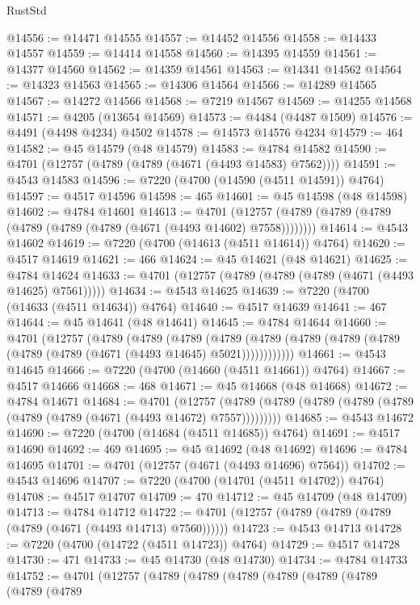 \begin{lexlean}{RustStd}
\begin{coremodule}
@14556 := @14471 @14555
@14557 := @14452 @14556
@14558 := @14433 @14557
@14559 := @14414 @14558
@14560 := @14395 @14559
@14561 := @14377 @14560
@14562 := @14359 @14561
@14563 := @14341 @14562
@14564 := @14323 @14563
@14565 := @14306 @14564
@14566 := @14289 @14565
@14567 := @14272 @14566
@14568 := @7219 @14567
@14569 := @14255 @14568
@14571 := @4205 (@13654 @14569)
@14573 := @4484 (@4487 @1509)
@14576 := @4491 (@4498 @4234) @4502
@14578 := @14573 @14576 @4234
@14579 := 464
@14582 := @45 @14579 (@48 @14579)
@14583 := @4784 @14582
@14590 := @4701 (@12757 (@4789 (@4789 (@4671 (@4493 @14583) @7562))))
@14591 := @4543 @14583
@14596 := @7220 (@4700 (@14590 (@4511 @14591)) @4764)
@14597 := @4517 @14596
@14598 := 465
@14601 := @45 @14598 (@48 @14598)
@14602 := @4784 @14601
@14613 := @4701
    (@12757 (@4789 (@4789 (@4789 (@4789 (@4789 (@4789 (@4671 (@4493 @14602) @7558))))))))
@14614 := @4543 @14602
@14619 := @7220 (@4700 (@14613 (@4511 @14614)) @4764)
@14620 := @4517 @14619
@14621 := 466
@14624 := @45 @14621 (@48 @14621)
@14625 := @4784 @14624
@14633 := @4701 (@12757 (@4789 (@4789 (@4789 (@4671 (@4493 @14625) @7561)))))
@14634 := @4543 @14625
@14639 := @7220 (@4700 (@14633 (@4511 @14634)) @4764)
@14640 := @4517 @14639
@14641 := 467
@14644 := @45 @14641 (@48 @14641)
@14645 := @4784 @14644
@14660 := @4701
    (@12757
      (@4789
        (@4789
          (@4789
            (@4789 (@4789 (@4789 (@4789 (@4789 (@4789 (@4789 (@4671 (@4493 @14645) @5021))))))))))))
@14661 := @4543 @14645
@14666 := @7220 (@4700 (@14660 (@4511 @14661)) @4764)
@14667 := @4517 @14666
@14668 := 468
@14671 := @45 @14668 (@48 @14668)
@14672 := @4784 @14671
@14684 := @4701
    (@12757 (@4789 (@4789 (@4789 (@4789 (@4789 (@4789 (@4789 (@4671 (@4493 @14672) @7557)))))))))
@14685 := @4543 @14672
@14690 := @7220 (@4700 (@14684 (@4511 @14685)) @4764)
@14691 := @4517 @14690
@14692 := 469
@14695 := @45 @14692 (@48 @14692)
@14696 := @4784 @14695
@14701 := @4701 (@12757 (@4671 (@4493 @14696) @7564))
@14702 := @4543 @14696
@14707 := @7220 (@4700 (@14701 (@4511 @14702)) @4764)
@14708 := @4517 @14707
@14709 := 470
@14712 := @45 @14709 (@48 @14709)
@14713 := @4784 @14712
@14722 := @4701 (@12757 (@4789 (@4789 (@4789 (@4789 (@4671 (@4493 @14713) @7560))))))
@14723 := @4543 @14713
@14728 := @7220 (@4700 (@14722 (@4511 @14723)) @4764)
@14729 := @4517 @14728
@14730 := 471
@14733 := @45 @14730 (@48 @14730)
@14734 := @4784 @14733
@14752 := @4701
    (@12757
      (@4789
        (@4789
          (@4789
            (@4789
              (@4789
                (@4789
                  (@4789
                    (@4789

\end{coremodule}
\end{lexlean}
